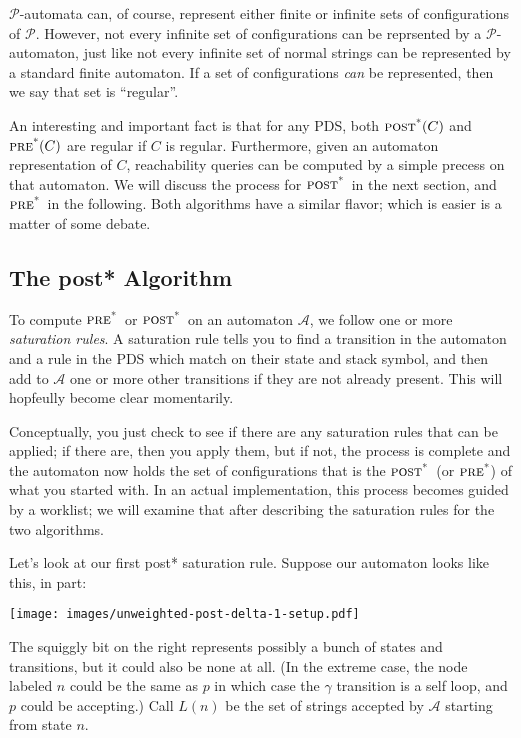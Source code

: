 \documentclass{article}
\newcommand{\poststar}{\ensuremath{\textsc{post}^\textsc{*}}}
\newcommand{\prestar}{\ensuremath{\textsc{pre}^\textsc{*}}}
\begin{document}
$\mathcal{P}$-automata can, of course, represent either finite or
infinite sets of configurations of $\mathcal{P}$. However, not every
infinite set of configurations can be reprsented by a
$\mathcal{P}$-automaton, just like not every infinite set of normal
strings can be represented by a standard finite automaton. If a set of
configurations \emph{can} be represented, then we say that set is
``regular''.

An interesting and important fact is that for any PDS, both
$\poststar(C)$ and $\prestar(C)$ are regular if $C$ is
regular. Furthermore, given an automaton representation of $C$,
reachability queries can be computed by a simple precess on that
automaton. We will discuss the process for \poststar\ in the next
section, and \prestar\ in the following. Both algorithms have a
similar flavor; which is easier is a matter of some debate.


\subsection{The post* Algorithm}

To compute \prestar\ or \poststar\ on an automaton $\mathcal{A}$, we
follow one or more \emph{saturation rules}. A saturation rule tells
you to find a transition in the automaton and a rule in the PDS which
match on their state and stack symbol, and then add to $\mathcal{A}$
one or more other transitions if they are not already present. This
will hopfeully become clear momentarily.

Conceptually, you just check to see if there are any saturation rules
that can be applied; if there are, then you apply them, but if not,
the process is complete and the automaton now holds the set of
configurations that is the \poststar\ (or \prestar) of what you
started with. In an actual implementation, this process becomes guided
by a worklist; we will examine that after describing the saturation
rules for the two algorithms.


Let's look at our first post* saturation rule. Suppose our automaton
looks like this, in part: \\
\begin{center}
  \texttt{[image: images/unweighted-post-delta-1-setup.pdf]}
\end{center}



The squiggly bit on the right represents possibly a bunch of states
and transitions, but it could also be none at all. (In the extreme
case, the node labeled $n$ could be the same as $p$ in which case the
$\gamma$ transition is a self loop, and $p$ could be accepting.) Call
$L(n)$ be the set of strings accepted by $\mathcal{A}$ starting from
state $n$.
\end{document}
